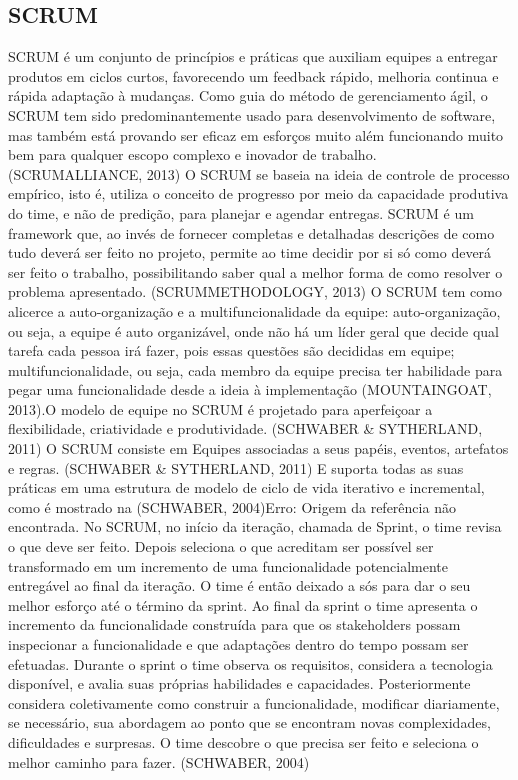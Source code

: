 \subsection{SCRUM}
SCRUM é um conjunto de princípios e práticas que auxiliam equipes a entregar produtos em ciclos curtos, favorecendo um feedback rápido, melhoria continua e rápida adaptação à mudanças. Como guia do método de gerenciamento ágil, o SCRUM tem sido predominantemente usado para desenvolvimento de software, mas também está provando ser eficaz em esforços muito além funcionando muito bem para qualquer escopo complexo e inovador de trabalho. (SCRUMALLIANCE, 2013)
O SCRUM se baseia na ideia de controle de processo empírico, isto é, utiliza o conceito de progresso por meio da capacidade produtiva do time, e não de predição, para planejar e agendar entregas. SCRUM é um framework que, ao invés de fornecer completas e detalhadas descrições de como tudo deverá ser feito no projeto, permite ao time decidir por si só como deverá ser feito o trabalho, possibilitando saber qual a melhor forma de como resolver o problema apresentado. (SCRUMMETHODOLOGY, 2013)
O SCRUM tem como alicerce a auto-organização e a multifuncionalidade da equipe: auto-organização, ou seja, a equipe é auto organizável, onde não há um líder geral que decide qual tarefa cada pessoa irá fazer, pois essas questões são decididas em equipe; multifuncionalidade, ou seja, cada membro da equipe precisa ter habilidade para pegar uma funcionalidade desde a ideia à implementação (MOUNTAINGOAT, 2013).O modelo de equipe no SCRUM é projetado para aperfeiçoar a flexibilidade, criatividade e produtividade. (SCHWABER & SYTHERLAND, 2011)
O SCRUM consiste em Equipes associadas a seus papéis, eventos, artefatos e regras. (SCHWABER & SYTHERLAND, 2011) E suporta todas as suas práticas em uma estrutura de modelo de ciclo de vida iterativo e incremental, como é mostrado na  (SCHWABER, 2004)Erro: Origem da referência não encontrada.
No SCRUM, no início da iteração, chamada de Sprint, o time revisa o que deve ser feito. Depois seleciona o que acreditam ser possível ser transformado em um incremento de uma funcionalidade potencialmente entregável ao final da iteração. O time é então deixado a sós para dar o seu melhor esforço até o término da sprint. Ao final da sprint o time apresenta o incremento da funcionalidade construída para que os stakeholders possam inspecionar a funcionalidade e que adaptações dentro do tempo possam ser efetuadas.
Durante o sprint o time observa os requisitos, considera a tecnologia disponível, e avalia suas próprias habilidades e capacidades. Posteriormente considera coletivamente como construir a funcionalidade, modificar diariamente, se necessário, sua abordagem ao ponto que se encontram novas complexidades, dificuldades e surpresas. O time descobre o que precisa ser feito e seleciona o melhor caminho para fazer. (SCHWABER, 2004)
